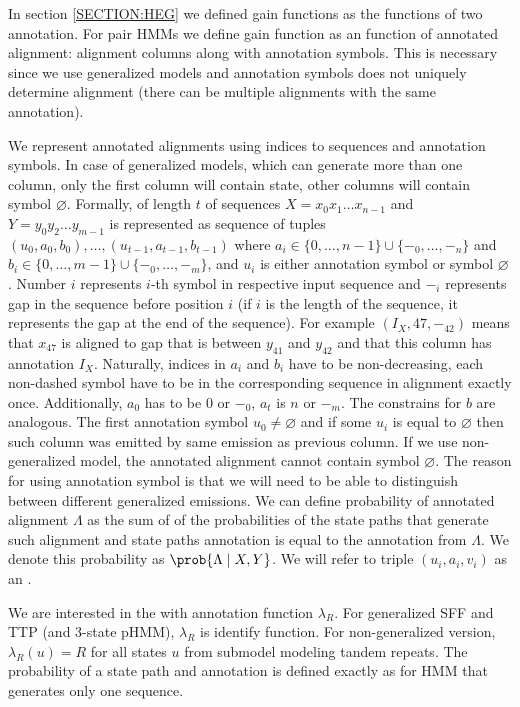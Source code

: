 In section \ref{SECTION:HEG} we defined gain functions as the functions of two
annotation. For pair HMMs we define gain function as an function of annotated
alignment: alignment columns along with annotation symbols. This is necessary
since we use generalized models and annotation symbols does not uniquely
determine alignment (there can be multiple alignments with the same
annotation).

We represent annotated alignments using indices to
sequences and annotation symbols. In case of generalized models, which can
generate more than one column, only the first column will contain state, other
columns will contain symbol $\varnothing$. Formally,  of length $t$ of sequences $X=x_0x_1\dots x_{n-1}$ and
$Y=y_0y_2\dots y_{m-1}$ is represented as sequence of tuples $(u_0, a_0, b_0),
\dots, (u_{t-1}, a_{t-1}, b_{t-1})$ where $a_i\in \{0, \dots, {n-1}\}\cup\{-_0,
\dots, -_n\}$ and $b_i \in \{0, \dots, m-1\}\cup\{-_0, \dots, -_m\}$, and $u_i$
is either annotation symbol or symbol $\varnothing$. Number $i$ represents
$i$-th symbol in respective input sequence and $-_i$ represents gap in the
sequence before position $i$ (if $i$ is the length of the sequence, it
represents the gap at the end of the sequence). For example $(I_X, 47, -_{42})$
means that $x_{47}$ is aligned to gap that is between $y_{41}$ and $y_{42}$ and
that this column has annotation $I_X$.  Naturally, indices in $a_i$ and $b_i$
have to be non-decreasing, each non-dashed symbol have to be in the
corresponding sequence in alignment exactly once. Additionally, $a_0$ has to be
$0$ or $-_{0}$, $a_t$ is $n$ or $-_m$. The constrains for $b$ are analogous.
The first annotation symbol $u_0\not=\varnothing$ and if some $u_i$ is equal to
$\varnothing$ then such column was emitted by same emission as previous column.
If we use non-generalized model, the annotated alignment cannot contain symbol
$\varnothing$. The reason for using annotation symbol is that we will need to
be able to distinguish between different generalized emissions. We can define
probability of annotated alignment $\Lambda$ as the sum of of the probabilities
of the state paths that generate such alignment and state paths annotation is
equal to the annotation from $\Lambda$. We denote this probability as
$\prob{\Lambda\mid X, Y}$. We will refer to triple $(u_i, a_i, v_i)$ as an
.

We are interested in the  with annotation
function $\lambda_R$.  For generalized SFF and TTP (and 3-state pHMM),
$\lambda_R$ is identify function. For non-generalized version, $\lambda_R(u)=R$
for all states $u$ from submodel modeling tandem repeats.  The probability of a
state path and annotation is defined exactly as for HMM that generates only one
sequence.

